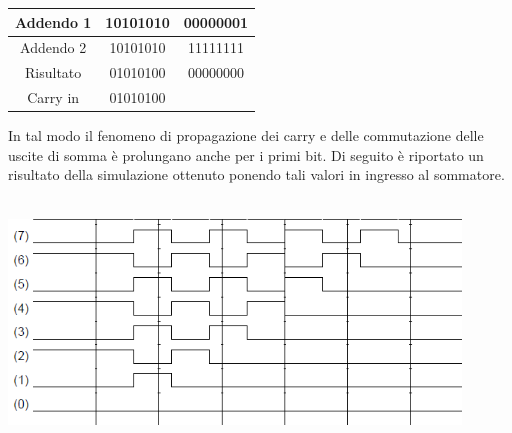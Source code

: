 \documentclass[11pt,  english, makeidx, a4paper, titlepage, oneside]{book}
\begin{document}
{\begin{center}
\begin{tabular}{|c|c|c|}
\hline
Addendo 1 & 10101010 & 00000001\\
\hline
Addendo 2 & 10101010 & 11111111\\
\hline
Risultato & 01010100 & 00000000\\
\hline
Carry in & 01010100 & \\
\hline
\end{tabular}
\end{center}
\vspace{0.3cm}
In tal modo il fenomeno di propagazione dei carry e delle commutazione delle uscite di somma è prolungano anche per i primi bit. Di seguito è 
riportato un risultato della simulazione ottenuto ponendo tali valori in ingresso al sommatore.
\\\\
\centerline{\includegraphics[width=12cm]{./img/Lab_1/Es_2/Worst_case_nostro.png}}
}
\newpage
\end{document}
